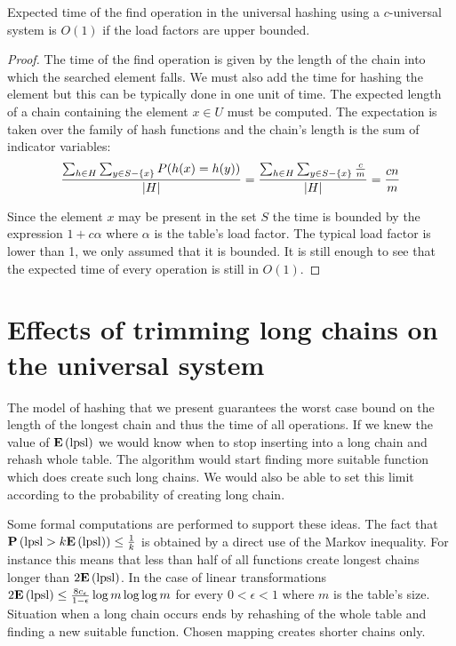 \begin{theorem}
\label{theorem-expected-chain-length-universal}
Expected time of the find operation in the universal hashing using a $c$-universal system is $O(1)$ if the load factors are upper bounded.
\end{theorem}
\begin{proof}
The time of the find operation is given by the length of the chain into which the searched element falls. We must also add the time for hashing the element but this can be typically done in one unit of time. The expected length of a chain containing the element $x \in U$ must be computed. The expectation is taken over the family of hash functions and the chain's length is the sum of indicator variables:
\begin{displaymath}
\frac{\sum\displaylimits_{h \in H} \sum\displaylimits_{y \in S - \lbrace x \rbrace} P(h(x) = h(y))}{|H|} = \frac{\sum\displaylimits_{h \in H} \sum\displaylimits_{y \in S - \lbrace x \rbrace} \frac{c}{m}}{|H|} = \frac{cn}{m}
\end{displaymath}

Since the element $x$ may be present in the set $S$ the time is bounded by the expression $1 + c\alpha$ where $\alpha$ is the table's load factor. The typical load factor is lower than 1, we only assumed that it is bounded. It is still enough to see that the expected time of every operation is still in $O(1)$.
\end{proof}

\section{Effects of trimming long chains on the universal system}
The model of hashing that we present guarantees the worst case bound on the length of the longest chain and thus the time of all operations. If we knew the value of $\mathbf{E}\left(\mathrm{lpsl}\right)$ we would know when to stop inserting into a long chain and rehash whole table. The algorithm would start finding more suitable function which does create such long chains. We would also be able to set this limit according to the probability of creating long chain.

Some formal computations are performed to support these ideas. The fact that $\mathbf{P}\left(\mathrm{lpsl} > k \mathbf{E}\left(\mathrm{lpsl}\right)\right) \leq \frac{1}{k}$ is obtained by a direct use of the Markov inequality. For instance this means that less than half of all functions create longest chains longer than $2 \mathbf{E}\left(\mathrm{lpsl}\right)$. In the case of linear transformations $2\mathbf{E}\left(\mathrm{lpsl}\right) \leq \frac{8 c_\epsilon}{1 - \epsilon} \log m \log \log m$ for every $0 < \epsilon < 1$ where $m$ is the table's size. Situation when a long chain occurs ends by rehashing of the whole table and finding a new suitable function. Chosen mapping creates shorter chains only.

